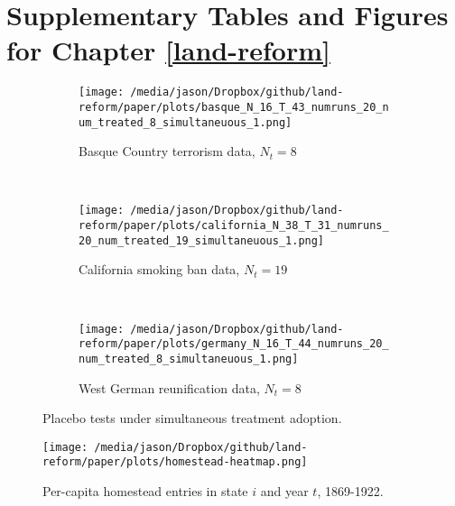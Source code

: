 \chapter{Supplementary Tables and Figures for Chapter \ref{land-reform}}


\begin{figure}[htbp]
	\centering
	\begin{subfigure}[t]{0.48\textwidth}
		\centering
		\texttt{[image: /media/jason/Dropbox/github/land-reform/paper/plots/basque\_N\_16\_T\_43\_numruns\_20\_num\_treated\_8\_simultaneuous\_1.png]}
		\caption{Basque Country terrorism data, $N_t = 8$} 
	\end{subfigure}
	~ 
	\begin{subfigure}[t]{0.48\textwidth}
		\centering
		\texttt{[image: /media/jason/Dropbox/github/land-reform/paper/plots/california\_N\_38\_T\_31\_numruns\_20\_num\_treated\_19\_simultaneuous\_1.png]}
		\caption{California smoking ban data, $N_t = 19$}
	\end{subfigure}
	~
	\begin{subfigure}[t]{0.48\textwidth}
		\centering
		\texttt{[image: /media/jason/Dropbox/github/land-reform/paper/plots/germany\_N\_16\_T\_44\_numruns\_20\_num\_treated\_8\_simultaneuous\_1.png]}
		\caption{West German reunification data, $N_t = 8$} 
	\end{subfigure}
	\caption{Placebo tests under simultaneous treatment adoption. \label{synth-sim}} 
\end{figure}

\begin{figure}[htbp]
	\begin{center}
		\texttt{[image: /media/jason/Dropbox/github/land-reform/paper/plots/homestead-heatmap.png]}
	\end{center}
	\caption{Per-capita homestead entries in state $i$ and year $t$, 1869-1922. \label{fig:homestead-heatmap}}
\end{figure}

